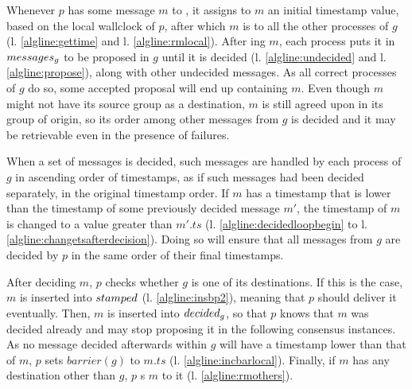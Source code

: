 \documentclass[times, 10pt]{article}
\begin{document}

Whenever $p$ has some message $m$ to \amcast, it assigns to $m$ an initial timestamp value, based on the local wallclock of $p$, after which $m$ is \rmcast{} to all the other processes of $g$ (l. \ref{algline:gettime} and l. \ref{algline:rmlocal}). After \rmdel{}ing $m$, each process puts it in $messages\text{$_g$}$ to be proposed in $g$ until it is decided (l. \ref{algline:undecided} and l. \ref{algline:propose}), along with other undecided messages. As all correct processes of $g$ do so, some accepted proposal will end up containing $m$. Even though $m$ might not have its source group as a destination, $m$ is still agreed upon in its group of origin, so its order among other messages from $g$ is decided and it may be retrievable even in the presence of failures.

When a set of messages is decided, such messages are handled by each process of $g$ in ascending order of timestamps, as if such messages had been decided separately, in the original timestamp order. If $m$ has a timestamp that is lower than the timestamp of some previously decided message $m'$, the timestamp of $m$ is changed to a value greater than $m'.ts$ (l. \ref{algline:decidedloopbegin} to l. \ref{algline:changetsafterdecision}). Doing so will ensure that all messages from $g$ are decided by $p$ in the same order of their final timestamps.

After deciding $m$, $p$ checks whether $g$ is one of its destinations. If this is the case, $m$ is inserted into $stamped$ (l. \ref{algline:insbp2}), meaning that $p$ should deliver it eventually. Then, $m$ is inserted into $decided\text{$_g$}$, so that $p$ knows that $m$ was decided already and may stop proposing it in the following consensus instances. As no message decided afterwards within $g$ will have a timestamp lower than that of $m$, $p$ sets $barrier(g)$ to $m.ts$ (l. \ref{algline:incbarlocal}).  Finally, if $m$ has any destination other than $g$, $p$ \rmcast{}s $m$ to it (l. \ref{algline:rmothers}).
\end{document}
